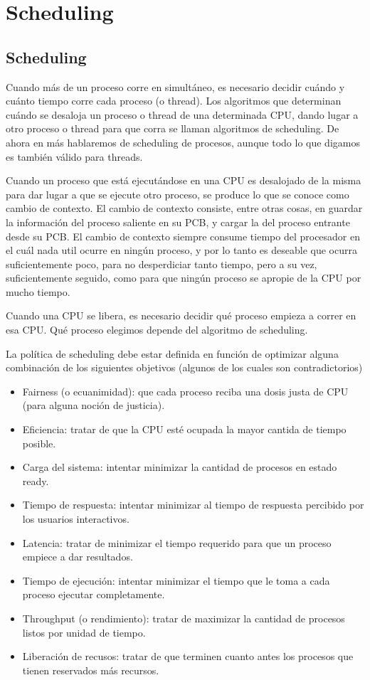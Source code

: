 \documentclass{article}
\begin{document}
\section{Scheduling}

\subsection{Scheduling}

Cuando m\'as de un proceso corre en simult\'aneo, es necesario decidir cu\'ando y cu\'anto tiempo corre cada proceso (o thread). Los algoritmos que determinan cu\'ando se desaloja un proceso o thread de una determinada CPU, dando lugar a otro proceso o thread para que corra se llaman algoritmos de scheduling. De ahora en m\'as hablaremos de scheduling de procesos, aunque todo lo que digamos es tambi\'en v\'alido para threads.

Cuando un proceso que est\'a ejecut\'andose en una CPU es desalojado de la misma para dar lugar a que se ejecute otro proceso, se produce lo que se conoce como cambio de contexto. El cambio de contexto consiste, entre otras cosas, en guardar la informaci\'on del proceso saliente en su PCB, y cargar la del proceso entrante desde su PCB. El cambio de contexto siempre consume tiempo del procesador en el cu\'al nada util ocurre en ning\'un proceso, y por lo tanto es deseable que ocurra suficientemente poco, para no desperdiciar tanto tiempo, pero a su vez, suficientemente seguido, como para que ning\'un proceso se apropie de la CPU por mucho tiempo.

Cuando una CPU se libera, es necesario decidir qu\'e proceso empieza a correr en esa CPU. Qu\'e proceso elegimos depende del algoritmo de scheduling.

La pol\'itica de scheduling debe estar definida en funci\'on de optimizar alguna combinaci\'on de los siguientes objetivos (algunos de los cuales son contradictorios)

\begin{itemize}
\item Fairness (o ecuanimidad): que cada proceso reciba una dosis justa de CPU (para alguna noci\'on de justicia).
\item Eficiencia: tratar de que la CPU est\'e ocupada la mayor cantida de tiempo posible.
\item Carga del sistema: intentar minimizar la cantidad de procesos en estado ready.
\item Tiempo de respuesta: intentar minimizar al tiempo de respuesta percibido por los usuarios interactivos.
\item Latencia: tratar de minimizar el tiempo requerido para que un proceso empiece a dar resultados.
\item Tiempo de ejecuci\'on: intentar minimizar el tiempo que le toma a cada proceso ejecutar completamente.
\item Throughput (o rendimiento): tratar de maximizar la cantidad de procesos listos por unidad de tiempo.
\item Liberaci\'on de recusos: tratar de que terminen cuanto antes los procesos que tienen reservados m\'as recursos.
\end{itemize}
\end{document}
